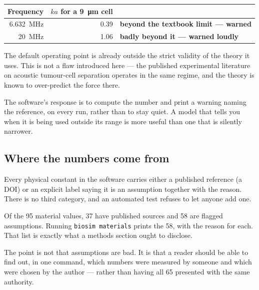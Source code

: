 \documentclass[11pt,a4paper]{article}
\begin{document}
\begin{center}\small
\begin{tabular}{rrl}
\toprule
\textbf{Frequency} & $ka$ \textbf{for a \SI{9}{\micro\meter} cell} & \\
\midrule
\SI{6.632}{\mega\hertz} & 0.39 & \textbf{beyond the textbook limit --- warned} \\
\SI{20}{\mega\hertz}    & 1.06 & \textbf{badly beyond it --- warned loudly} \\
\bottomrule
\end{tabular}
\end{center}

\begin{warnbox}
The default operating point is already outside the strict validity of the theory
it uses. This is not a flaw introduced here --- the published experimental
literature on acoustic tumour-cell separation operates in the same regime, and
the theory is known to over-predict the force there.

The software's response is to compute the number and print a warning naming the
reference, on every run, rather than to stay quiet. A model that tells you when
it is being used outside its range is more useful than one that is silently
narrower.
\end{warnbox}

\subsection*{Where the numbers come from}

Every physical constant in the software carries either a published reference
(a DOI) or an explicit label saying it is an assumption together with the reason.
There is no third category, and an automated test refuses to let anyone add one.

Of the 95 material values, 37 have published sources and 58 are flagged
assumptions. Running \texttt{biosim materials} prints the 58, with the reason for
each. That list is exactly what a methods section ought to disclose.

\begin{plain}
The point is not that assumptions are bad. It is that a reader should be able to
find out, in one command, which numbers were measured by someone and which were
chosen by the author --- rather than having all 65 presented with the same
authority.
\end{plain}

\clearpage
\end{document}
